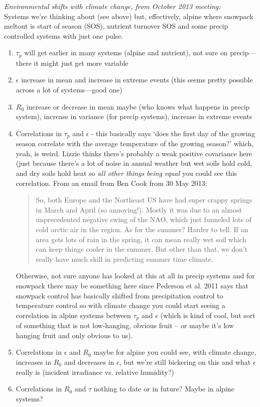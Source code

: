 \documentclass[11pt,a4paper,oneside]{article}
\begin{document}
\noindent \emph{Environmental shifts with climate change, from October 2013 meeting:}\\
Systems we're thinking about (see above) but, effectively, alpine where snowpack meltout is start of season (SOS), nutrient turnover SOS and some precip controlled systems with just one pulse. 
\begin{enumerate}
\item \(\tau_{p}\) will get earlier in many systems (alpine and nutrient), not sure on precip---there it might just get more variable
\item \(\epsilon\) increase in mean and increase in extreme events (this seems pretty possible across a lot of systems---good one)
\item \(R_{0}\) increase or decrease in mean maybe (who knows what happens in precip system), increase in variance (for precip systems), increase in extreme events 
\item Correlations in \(\tau_{p}\) and \(\epsilon\) - this basically says `does the first day of the growing season correlate with the average temperature of the growing season?' which, yeah, is weird. Lizzie thinks there's probably a weak positive covariance here (just because there's a lot of noise in annual weather but wet soils hold cold, and dry soils hold heat so \emph{all other things being equal} you could see this correlation. From an email from Ben Cook from 30 May 2013:
\begin{quote}
So, both Europe and the Northeast US have had super crappy springs in March and April (so annoying!). Mostly it was due to an almost unprecedented negative swing of the NAO, which just funneled lots of cold arctic air in the region. As for the summer? Harder to tell. If an area gets lots of rain in the spring, it can mean really wet soil which can keep things cooler in the summer. But other than that, we don't really have much skill in predicting summer time climate. 
\end{quote}
Otherwise, not sure anyone has looked at this at all in precip systems and for snowpack there may be something here since Pederson et al. 2011 says that snowpack control has basically shifted from precipitation control to temperature control so with climate change you could start seeing a correlation in alpine systems between \(\tau_{p}\) and \(\epsilon\) (which is kind of cool, but sort of something that is not low-hanging, obvious fruit -- or maybe it's low hanging fruit and only obvious to us).
\item Correlations in \(\epsilon\) and \(R_{0}\) maybe for alpine you could see, with climate change, increases in \(R_{0}\)  and decreases in \(\epsilon\), but we're still bickering on this and what \(\epsilon\) really is (incident irradiance vs. relative humidity?)
\item Correlations in \(R_{0}\) and \(\tau\) nothing to date or in future? Maybe in alpine systems?
\end{enumerate}
\end{document}
